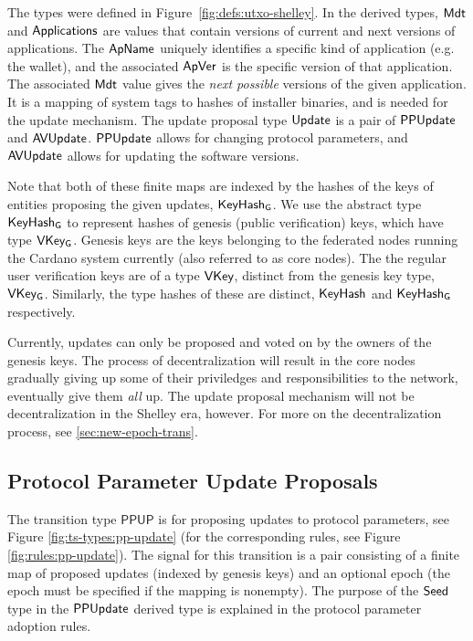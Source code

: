 The types were defined in Figure~\ref{fig:defs:utxo-shelley}.
In the derived types, $\mathsf{Mdt}$ and $\mathsf{Applications}$ are values
that contain versions of current and next versions of applications.
The $\mathsf{ApName}$ uniquely identifies a specific kind of application (e.g.
the wallet), and the associated $\mathsf{ApVer}$ is the specific version of that
application. The associated $\mathsf{Mdt}$ value gives the \textit{next possible}
versions of the given application. It is a mapping of system tags to hashes of
installer binaries, and is needed for the update mechanism.
The update proposal type $\mathsf{Update}$ is a pair of $\mathsf{PPUpdate}$ and $\mathsf{AVUpdate}$.
$\mathsf{PPUpdate}$ allows for changing protocol parameters,
and $\mathsf{AVUpdate}$ allows for updating the software versions.

Note that both of these finite maps are indexed by the hashes of the keys of
entities proposing the given updates, $\mathsf{KeyHash_G}$.
We use the abstract type $\mathsf{KeyHash_G}$ to represent hashes of genesis
(public verification) keys, which have type $\mathsf{VKey_G}$.
Genesis keys are the keys belonging to the federated
nodes running the Cardano system currently (also referred to as core nodes).
The the regular user verification keys are of a type $\mathsf{VKey}$, distinct from the
genesis key type, $\mathsf{VKey_G}$. Similarly, the type hashes of these
are distinct, $\mathsf{KeyHash}$ and $\mathsf{KeyHash_G}$ respectively.

Currently, updates can only be proposed and voted on by the owners of the genesis keys.
The process of decentralization will result in the core nodes gradually giving up
some of their priviledges and responsibilities to the network,
eventually give them \textit{all} up.
The update proposal mechanism will not be decentralization in the Shelley era, however.
For more on the decentralization process, see \ref{sec:new-epoch-trans}.

\subsection{Protocol Parameter Update Proposals}
\label{sec:pp-proposals}

The transition type $\mathsf{PPUP}$ is for proposing updates to protocol
parameters, see Figure \ref{fig:ts-types:pp-update} (for the corresponding rules,
see Figure \ref{fig:rules:pp-update}).
The signal for this transition is a pair consisting of a finite map of
proposed updates (indexed by genesis keys) and an optional epoch
(the epoch must be specified if the mapping is nonempty).
The purpose of the $\mathsf{Seed}$ type in the $\mathsf{PPUpdate}$ derived type is explained
in the protocol parameter adoption rules.

